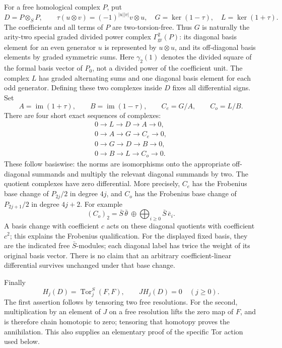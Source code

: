 For a free homological complex \(P\), put
\[
 D=P\otimes_S P,\qquad
 \tau(u\otimes v)=(-1)^{|u||v|}v\otimes u,
 \quad G=\ker(1-\tau),\quad L=\ker(1+\tau).
\]
The coefficients and all terms of \(P\) are two-torsion-free.
Thus \(G\) is naturally the arity-two special graded divided
power complex \(\Gamma^2_{\mathrm{gr}}(P)\): its diagonal
basis element for an even generator \(u\) is represented by
\(u\otimes u\), and its off-diagonal basis elements by graded
symmetric sums.  Here \(\gamma_2(1)\) denotes the divided
square of the formal basis vector of \(P_0\), not a divided
power of the coefficient unit.  The complex \(L\) has graded alternating sums
and one diagonal basis element for each odd generator.  Defining
these two complexes inside \(D\) fixes all differential signs.
Set
\[
 A=\operatorname{im}(1+\tau),\qquad
 B=\operatorname{im}(1-\tau),\qquad
 C_e=G/A,\qquad C_o=L/B.
\]
There are four short exact sequences of complexes:
\[
 \begin{gathered}
 0\longrightarrow L\longrightarrow D\longrightarrow A\longrightarrow0,\\
 0\longrightarrow A\longrightarrow G\longrightarrow C_e\longrightarrow0,\\
 0\longrightarrow G\longrightarrow D\longrightarrow B\longrightarrow0,\\
 0\longrightarrow B\longrightarrow L\longrightarrow C_o\longrightarrow0.
 \end{gathered}                                                    \tag{136.QT4}
\]
These follow basiswise: the norms are isomorphisms onto the
appropriate off-diagonal summands and multiply the relevant
diagonal summands by two.  The quotient complexes have zero
differential.  More precisely, \(C_e\) has the Frobenius base
change of \(P_{2j}/2\) in degree \(4j\), and \(C_o\) has
the Frobenius base change of \(P_{2j+1}/2\) in degree \(4j+2\).
For example
\[
 (C_o)_2=\bar S\,\bar\theta\ \oplus
                      \bigoplus_{i\geq0}\bar S\,\bar e_i.
                                                               \tag{136.QT5}
\]
A basis change with coefficient \(c\) acts on these diagonal
quotients with coefficient \(c^2\); this explains the Frobenius
qualification.  For the displayed fixed basis, they are the
indicated free \(\bar S\)-modules; each diagonal label has
twice the weight of its original basis vector.  There is no claim that
an arbitrary coefficient-linear differential survives unchanged
under that base change.

Finally
\[
 H_j(D)=\operatorname{Tor}_j^S(F,F),\qquad
                       J H_j(D)=0\quad(j\geq0).
                                                               \tag{136.QT6}
\]
The first assertion follows by tensoring two free resolutions.
For the second, multiplication by an element of \(J\) on a
free resolution lifts the zero map of \(F\), and is therefore
chain homotopic to zero; tensoring that homotopy proves the
annihilation.  This also supplies an elementary proof of the
specific Tor action used below.

